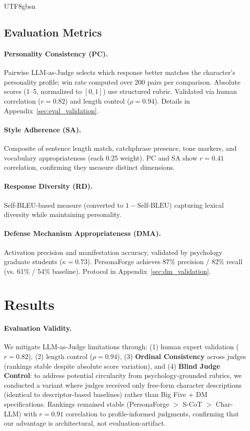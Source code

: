 \documentclass[11pt]{article}
\begin{document}
\begin{CJK*}{UTF8}{gbsn}
\subsection{Evaluation Metrics}

\paragraph{Personality Consistency (PC).} Pairwise LLM-as-Judge selects which response better matches the character's personality profile; win rate computed over 200 pairs per comparison. Absolute scores (1--5, normalized to $[0,1]$) use structured rubric. Validated via human correlation ($r = 0.82$) and length control ($\rho=0.94$). Details in Appendix~\ref{sec:eval_validation}.

\paragraph{Style Adherence (SA).} Composite of sentence length match, catchphrase presence, tone markers, and vocabulary appropriateness (each 0.25 weight). PC and SA show $r=0.41$ correlation, confirming they measure distinct dimensions.

\paragraph{Response Diversity (RD).} Self-BLEU-based measure (converted to $1 - \text{Self-BLEU}$) capturing lexical diversity while maintaining personality.

\paragraph{Defense Mechanism Appropriateness (DMA).} Activation precision and manifestation accuracy, validated by psychology graduate students ($\kappa=0.73$). PersonaForge achieves 87\% precision / 82\% recall (vs. 61\% / 54\% baseline). Protocol in Appendix~\ref{sec:dm_validation}.

\section{Results}

\paragraph{Evaluation Validity.} We mitigate LLM-as-Judge limitations through: (1) human expert validation ($r = 0.82$), (2) length control ($\rho=0.94$), (3) \textbf{Ordinal Consistency} across judges (rankings stable despite absolute score variation), and (4) \textbf{Blind Judge Control}: to address potential circularity from psychology-grounded rubrics, we conducted a variant where judges received only free-form character descriptions (identical to descriptor-based baselines) rather than Big Five + DM specifications. Rankings remained stable (PersonaForge $>$ S-CoT $>$ Char-LLM) with $r=0.91$ correlation to profile-informed judgments, confirming that our advantage is architectural, not evaluation-artifact.



\end{CJK*}
\end{document}
